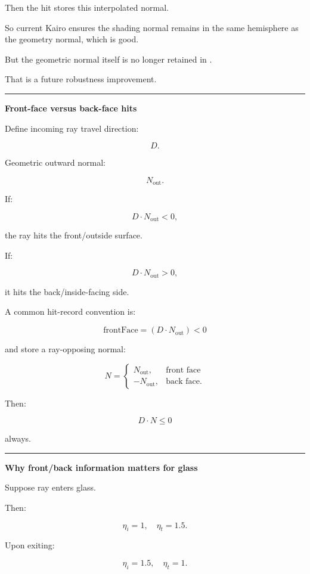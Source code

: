 Then the hit stores this interpolated normal.

So current Kairo ensures the shading normal remains in the same hemisphere as the geometry normal, which is good.

But the geometric normal itself is no longer retained in .

That is a future robustness improvement.

\begin{center}\rule{0.5\linewidth}{0.5pt}\end{center}

\textbf{Front-face versus back-face hits}

Define incoming ray travel direction:

\[
D.
\]

Geometric outward normal:

\[
N_{\text{out}}.
\]

If:

\[
D\cdot N_{\text{out}}<0,
\]

the ray hits the front/outside surface.

If:

\[
D\cdot N_{\text{out}}>0,
\]

it hits the back/inside-facing side.

A common hit-record convention is:

\[
\boxed{
\text{frontFace}
=
(D\cdot N_{\text{out}})<0
}
\]

and store a ray-opposing normal:

\[
N=
\begin{cases}
N_{\text{out}}, & \text{front face}\\
-N_{\text{out}}, & \text{back face}.
\end{cases}
\]

Then:

\[
D\cdot N\le0
\]

always.

\begin{center}\rule{0.5\linewidth}{0.5pt}\end{center}

\textbf{Why front/back information matters for glass}

Suppose ray enters glass.

Then:

\[
\eta_i=1,
\quad
\eta_t=1.5.
\]

Upon exiting:

\[
\eta_i=1.5,
\quad
\eta_t=1.
\]

